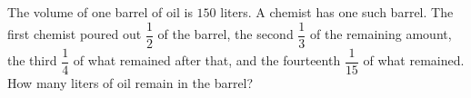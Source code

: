 The volume of one barrel of oil is $150$ liters. A chemist has one such barrel. The first chemist poured out $\dfrac{1}{2}$ of the barrel, the second $\dfrac{1}{3}$ of the remaining amount, the third $\dfrac{1}{4}$ of what remained after that, and the fourteenth $\dfrac{1}{15}$ of what remained. How many liters of oil remain in the barrel?
